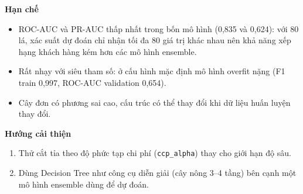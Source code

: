 \textbf{Hạn chế}
\begin{itemize}
    \item ROC-AUC và PR-AUC thấp nhất trong bốn mô hình (0,835 và 0,624): với 80 lá, xác suất dự đoán chỉ nhận tối đa 80 giá trị khác nhau nên khả năng xếp hạng khách hàng kém hơn các mô hình ensemble.
    \item Rất nhạy với siêu tham số: ở cấu hình mặc định mô hình overfit nặng (F1 train 0,997, ROC-AUC validation 0,654).
    \item Cây đơn có phương sai cao, cấu trúc có thể thay đổi khi dữ liệu huấn luyện thay đổi.
\end{itemize}

\textbf{Hướng cải thiện}
\begin{enumerate}
    \item Thử cắt tỉa theo độ phức tạp chi phí (\texttt{ccp\_alpha}) thay cho giới hạn độ sâu.
    \item Dùng Decision Tree như công cụ diễn giải (cây nông 3--4 tầng) bên cạnh một mô hình ensemble dùng để dự đoán.
\end{enumerate}
